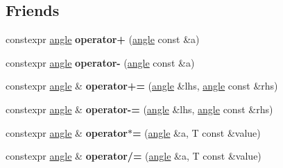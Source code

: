 \subsection*{Friends}
\begin{DoxyCompactItemize}
\item 
\mbox{\label{classpyrite_1_1math_1_1angle_aace8cc4c31692174ca8d9644007743e8}} 
constexpr \mbox{\hyperlink{classpyrite_1_1math_1_1angle}{angle}} {\bfseries operator+} (\mbox{\hyperlink{classpyrite_1_1math_1_1angle}{angle}} const \&a)
\item 
\mbox{\label{classpyrite_1_1math_1_1angle_af42bd0fef2d808bddfc3d271f53f8838}} 
constexpr \mbox{\hyperlink{classpyrite_1_1math_1_1angle}{angle}} {\bfseries operator-\/} (\mbox{\hyperlink{classpyrite_1_1math_1_1angle}{angle}} const \&a)
\item 
\mbox{\label{classpyrite_1_1math_1_1angle_a45f3de0aaf46d319c018f0b5e52c9cc8}} 
constexpr \mbox{\hyperlink{classpyrite_1_1math_1_1angle}{angle}} \& {\bfseries operator+=} (\mbox{\hyperlink{classpyrite_1_1math_1_1angle}{angle}} \&lhs, \mbox{\hyperlink{classpyrite_1_1math_1_1angle}{angle}} const \&rhs)
\item 
\mbox{\label{classpyrite_1_1math_1_1angle_ad088ca5eac35b4e997dd84f90002801e}} 
constexpr \mbox{\hyperlink{classpyrite_1_1math_1_1angle}{angle}} \& {\bfseries operator-\/=} (\mbox{\hyperlink{classpyrite_1_1math_1_1angle}{angle}} \&lhs, \mbox{\hyperlink{classpyrite_1_1math_1_1angle}{angle}} const \&rhs)
\item 
\mbox{\label{classpyrite_1_1math_1_1angle_a2d582706b0ff59dc60fbc2a426f9994e}} 
constexpr \mbox{\hyperlink{classpyrite_1_1math_1_1angle}{angle}} \& {\bfseries operator$\ast$=} (\mbox{\hyperlink{classpyrite_1_1math_1_1angle}{angle}} \&a, T const \&value)
\item 
\mbox{\label{classpyrite_1_1math_1_1angle_a1354205c05bea757c2ac060a0e6c043b}} 
constexpr \mbox{\hyperlink{classpyrite_1_1math_1_1angle}{angle}} \& {\bfseries operator/=} (\mbox{\hyperlink{classpyrite_1_1math_1_1angle}{angle}} \&a, T const \&value)
\item 

\end{DoxyCompactItemize}
